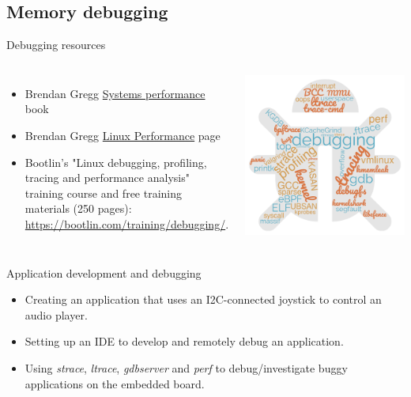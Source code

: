 \subsection{Memory debugging}



\begin{frame}{Debugging resources}
  \begin{columns}
  \begin{itemize}
  \item Brendan Gregg
    \href{https://www.brendangregg.com/systems-performance-2nd-edition-book.html}{Systems
      performance} book
  \item Brendan Gregg
    \href{https://www.brendangregg.com/linuxperf.html}{Linux
      Performance} page
  \item Bootlin's "Linux debugging, profiling, tracing and performance
        analysis" training course and free training materials
        (250 pages): \url{https://bootlin.com/training/debugging/}.
  \end{itemize}
  \includegraphics[height=0.6\textheight]{slides/debugging-principles/cloud_word.png}
  \end{columns}
\end{frame}

\setuplabframe
{Application development and debugging}
{
  \begin{itemize}
  \item Creating an application that uses an I2C-connected joystick to
    control an audio player.
  \item Setting up an IDE to develop and remotely debug an
    application.
  \item Using {\em strace}, {\em ltrace}, {\em gdbserver} and {\em
      perf} to debug/investigate buggy applications on the embedded
    board.
  \end{itemize}
}

